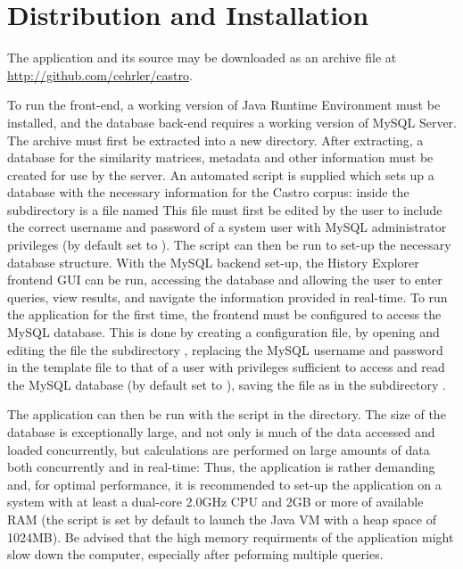 \section{Distribution and Installation}
The application and its source may be downloaded as an archive file at \url{http://github.com/cehrler/castro}.

To run the front-end, a working version of Java Runtime Environment must be installed, and the
database back-end requires a working version of MySQL Server. The archive must first be extracted
into a new directory. After extracting, a database for the similarity matrices, metadata and other
information must be created for use by the server. An automated script is supplied which sets up a
database with the necessary information for the Castro corpus: inside the 
subdirectory is a file named  This file must first be edited by the user to
include the correct username and password of a system user with MySQL administrator privileges (by
default set to ). The script can then be run to set-up the necessary database structure.
With the MySQL backend set-up, the History Explorer frontend GUI can be run, accessing the database
and allowing the user to enter queries, view results, and navigate the information provided in
real-time. To run the application for the first time, the frontend must be configured to access the
MySQL database. This is done by creating a configuration file, by opening and editing the file
 the subdirectory , replacing the MySQL username
and password in the template file to that of a user with privileges sufficient to access and read
the MySQL database (by default set to ), saving the file as  in the
subdirectory .

The application can then be run with the script  in the  directory. The size of the database is exceptionally large, and not only is much of the data accessed and loaded concurrently, but calculations are performed on large amounts of data both concurrently and in real-time: Thus, the application is rather demanding and, for optimal performance, it is recommended to set-up the application on a system with at least a dual-core 2.0GHz CPU and 2GB or more of available RAM (the script is set by default to launch the Java VM with a heap space of 1024MB). Be advised that the high memory requirments of the application might slow down the computer, especially after peforming multiple queries. 

